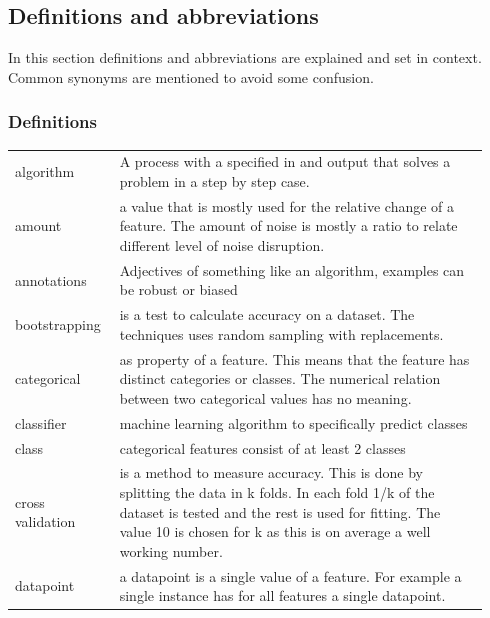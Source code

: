 \documentclass[a4paper,10pt]{article}
\begin{document}
\subsection{Definitions and abbreviations}
In this section definitions and abbreviations are explained and set in context. Common synonyms are mentioned to avoid some confusion.
\subsubsection{Definitions}

\begin{tabular}{ p{0.20\linewidth} p{0.7437\linewidth} }
	
	algorithm & A process with a specified in and output that solves a problem in a step by step case.\\ [1ex]
	
	amount & a value that is mostly used for the relative change of a feature. The amount of noise is mostly a ratio to relate different level of noise disruption. \\[1ex]	
	
	annotations & Adjectives of something like an algorithm, examples can be robust or biased\\ [1ex]
	
	bootstrapping & is a test to calculate accuracy on a dataset. The techniques uses random sampling with replacements.  \\ [1ex]
	
	categorical & as property of a feature. This means that the feature has distinct categories or classes. The numerical relation between two categorical values has no meaning. \\ [1ex]
	
	classifier & machine learning algorithm to specifically predict classes \\ [1ex]
	
	class	 & categorical features consist of at least 2 classes\\ [1ex]
	
	cross validation & is a method to measure accuracy. This is done by splitting the data in k folds. In each fold 1/k of the dataset is tested and the rest is used for fitting. The value 10 is chosen for k as this is on average a well working number\cite{Cross}. \\ [1ex]
	
	datapoint & a datapoint is a single value of a feature. For example a single instance has for all features a single datapoint.\\[1ex]
	

\end{tabular}
\end{document}
